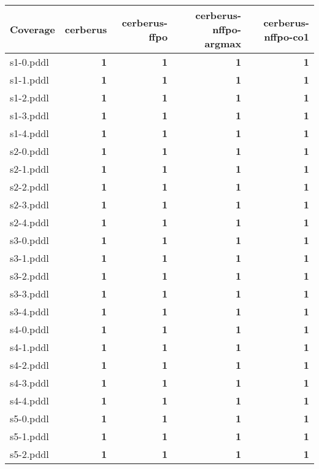 \documentclass{article}
\begin{document}
\begin{tabular}{@{}lrrrr@{}}
Coverage & cerberus & cerberus-ffpo & cerberus-nffpo-argmax & cerberus-nffpo-co1 \\
\midrule
s1-0.pddl & \textbf{1} & \textbf{1} & \textbf{1} & \textbf{1} \\
s1-1.pddl & \textbf{1} & \textbf{1} & \textbf{1} & \textbf{1} \\
s1-2.pddl & \textbf{1} & \textbf{1} & \textbf{1} & \textbf{1} \\
s1-3.pddl & \textbf{1} & \textbf{1} & \textbf{1} & \textbf{1} \\
s1-4.pddl & \textbf{1} & \textbf{1} & \textbf{1} & \textbf{1} \\
s2-0.pddl & \textbf{1} & \textbf{1} & \textbf{1} & \textbf{1} \\
s2-1.pddl & \textbf{1} & \textbf{1} & \textbf{1} & \textbf{1} \\
s2-2.pddl & \textbf{1} & \textbf{1} & \textbf{1} & \textbf{1} \\
s2-3.pddl & \textbf{1} & \textbf{1} & \textbf{1} & \textbf{1} \\
s2-4.pddl & \textbf{1} & \textbf{1} & \textbf{1} & \textbf{1} \\
s3-0.pddl & \textbf{1} & \textbf{1} & \textbf{1} & \textbf{1} \\
s3-1.pddl & \textbf{1} & \textbf{1} & \textbf{1} & \textbf{1} \\
s3-2.pddl & \textbf{1} & \textbf{1} & \textbf{1} & \textbf{1} \\
s3-3.pddl & \textbf{1} & \textbf{1} & \textbf{1} & \textbf{1} \\
s3-4.pddl & \textbf{1} & \textbf{1} & \textbf{1} & \textbf{1} \\
s4-0.pddl & \textbf{1} & \textbf{1} & \textbf{1} & \textbf{1} \\
s4-1.pddl & \textbf{1} & \textbf{1} & \textbf{1} & \textbf{1} \\
s4-2.pddl & \textbf{1} & \textbf{1} & \textbf{1} & \textbf{1} \\
s4-3.pddl & \textbf{1} & \textbf{1} & \textbf{1} & \textbf{1} \\
s4-4.pddl & \textbf{1} & \textbf{1} & \textbf{1} & \textbf{1} \\
s5-0.pddl & \textbf{1} & \textbf{1} & \textbf{1} & \textbf{1} \\
s5-1.pddl & \textbf{1} & \textbf{1} & \textbf{1} & \textbf{1} \\
s5-2.pddl & \textbf{1} & \textbf{1} & \textbf{1} & \textbf{1} \\

\end{tabular}
\end{document}
